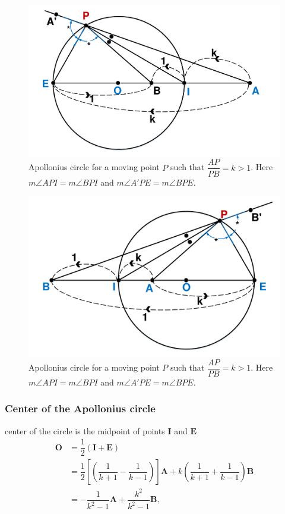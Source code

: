 \documentclass{beamer}
\begin{document}
\begin{frame}
\begin{figure}[htb]
\centering
\includegraphics[scale = 0.3]{fig/drawing1.pdf}
\caption{Apollonius circle for a moving point $P$ such that $\dfrac{AP}{PB}=k>1$. Here $m\angle API = m\angle BPI$ and $m\angle A'PE = m\angle BPE$.}
\label{1}
\end{figure}
\end{frame}
\begin{frame}
\begin{figure}[htb]
\centering
\includegraphics[scale = 0.3]{fig/drawing2.pdf}
\caption{Apollonius circle for a moving point $P$ such that $\dfrac{AP}{PB}=k>1$. Here $m\angle API = m\angle BPI$ and $m\angle A'PE = m\angle BPE$.}
\label{1}
\end{figure}
\end{frame}
\begin{frame}
\frametitle{Center of the Apollonius circle}
center of the circle is the midpoint of points $\boldsymbol{I}$ and $\boldsymbol{E}$
\begin{equation}
\begin{split}
\boldsymbol{O} & = \dfrac{1}{2} (\boldsymbol{I}+\boldsymbol{E})\\
& = \dfrac{1}{2} [(\dfrac{1}{k+1}-\dfrac{1}{k-1})]\boldsymbol{A}+k(\dfrac{1}{k+1}+\dfrac{1}{k-1}) \boldsymbol{B}\\
& =-\dfrac{1}{k^{2}-1}\boldsymbol{A} + \dfrac{{k^{2}}}{k^{2}-1} \boldsymbol{B},
\end{split}
\label{eqn:center}
\end{equation}
\end{frame}
\end{document}
